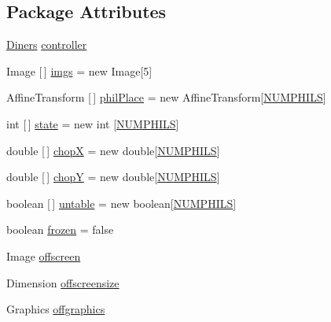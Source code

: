 \subsection*{Package Attributes}
\begin{DoxyCompactItemize}
\item 
\mbox{\hyperlink{classconcurrency_1_1diners_1_1_diners}{Diners}} \mbox{\hyperlink{classconcurrency_1_1diners_1_1_phil_canvas_a4c2bf3503b1a431ccacca410c3abd222}{controller}}
\item 
Image \mbox{[}$\,$\mbox{]} \mbox{\hyperlink{classconcurrency_1_1diners_1_1_phil_canvas_a107d0c96c4c1050eca2998d5ae198cea}{imgs}} = new Image\mbox{[}5\mbox{]}
\item 
Affine\+Transform \mbox{[}$\,$\mbox{]} \mbox{\hyperlink{classconcurrency_1_1diners_1_1_phil_canvas_a7bc660c3c92202be5de56022e6c2cf41}{phil\+Place}} = new Affine\+Transform\mbox{[}\mbox{\hyperlink{classconcurrency_1_1diners_1_1_phil_canvas_a3eeb58e8b150bc1715a708ef38171fd5}{N\+U\+M\+P\+H\+I\+LS}}\mbox{]}
\item 
int \mbox{[}$\,$\mbox{]} \mbox{\hyperlink{classconcurrency_1_1diners_1_1_phil_canvas_afe8fe2130ea9e415bdf1887ec73596c0}{state}} = new int \mbox{[}\mbox{\hyperlink{classconcurrency_1_1diners_1_1_phil_canvas_a3eeb58e8b150bc1715a708ef38171fd5}{N\+U\+M\+P\+H\+I\+LS}}\mbox{]}
\item 
double \mbox{[}$\,$\mbox{]} \mbox{\hyperlink{classconcurrency_1_1diners_1_1_phil_canvas_a242029d46b5931d89cd7bf3894905d16}{chopX}} = new double\mbox{[}\mbox{\hyperlink{classconcurrency_1_1diners_1_1_phil_canvas_a3eeb58e8b150bc1715a708ef38171fd5}{N\+U\+M\+P\+H\+I\+LS}}\mbox{]}
\item 
double \mbox{[}$\,$\mbox{]} \mbox{\hyperlink{classconcurrency_1_1diners_1_1_phil_canvas_aba4e88ab02194e29db655d0075f549f2}{chopY}} = new double\mbox{[}\mbox{\hyperlink{classconcurrency_1_1diners_1_1_phil_canvas_a3eeb58e8b150bc1715a708ef38171fd5}{N\+U\+M\+P\+H\+I\+LS}}\mbox{]}
\item 
boolean \mbox{[}$\,$\mbox{]} \mbox{\hyperlink{classconcurrency_1_1diners_1_1_phil_canvas_a52cc075fd7ba820c26006a73690a49c1}{untable}} = new boolean\mbox{[}\mbox{\hyperlink{classconcurrency_1_1diners_1_1_phil_canvas_a3eeb58e8b150bc1715a708ef38171fd5}{N\+U\+M\+P\+H\+I\+LS}}\mbox{]}
\item 
boolean \mbox{\hyperlink{classconcurrency_1_1diners_1_1_phil_canvas_a0579ad1dffdd10626026d52e95d0d86a}{frozen}} = false
\item 
Image \mbox{\hyperlink{classconcurrency_1_1diners_1_1_phil_canvas_acad40c9dc3eba609d61f21b19292fb59}{offscreen}}
\item 
Dimension \mbox{\hyperlink{classconcurrency_1_1diners_1_1_phil_canvas_a3f984b3894636ddef4df8a8e60f8c418}{offscreensize}}
\item 
Graphics \mbox{\hyperlink{classconcurrency_1_1diners_1_1_phil_canvas_a8ef774c408aeaad890a9cdb7d5bc6a5a}{offgraphics}}
\end{DoxyCompactItemize}
